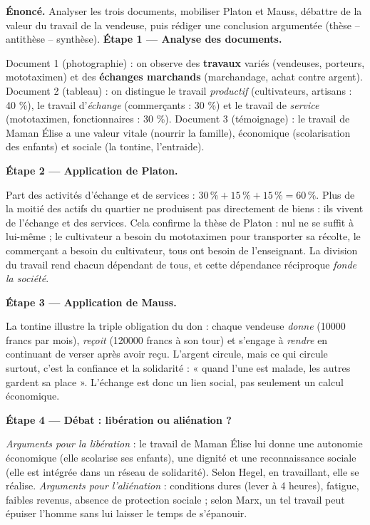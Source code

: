 \documentclass[11pt]{article}
\newcommand{\cle}[1]{{\popxbold\color{popdark}#1}}
\begin{document}
\begin{exoresolu}
\textbf{Énoncé.} Analyser les trois documents, mobiliser Platon et Mauss, débattre de la valeur du travail de la vendeuse, puis rédiger une conclusion argumentée (thèse -- antithèse -- synthèse).
\tcblower
\textbf{Étape 1 --- Analyse des documents.}

Document 1 (photographie) : on observe des \textbf{travaux} variés (vendeuses, porteurs, mototaximen) et des \textbf{échanges marchands} (marchandage, achat contre argent). Document 2 (tableau) : on distingue le travail \emph{productif} (cultivateurs, artisans : 40 \%), le travail d'\emph{échange} (commerçants : 30 \%) et le travail de \emph{service} (mototaximen, fonctionnaires : 30 \%). Document 3 (témoignage) : le travail de Maman Élise a une valeur vitale (nourrir la famille), économique (scolarisation des enfants) et sociale (la tontine, l'entraide).

\textbf{Étape 2 --- Application de Platon.}

Part des activités d'échange et de services : $30\,\% + 15\,\% + 15\,\% = 60\,\%$. Plus de la moitié des actifs du quartier ne produisent pas directement de biens : ils vivent de l'échange et des services. Cela confirme la thèse de Platon : nul ne se suffit à lui-même ; le cultivateur a besoin du mototaximen pour transporter sa récolte, le commerçant a besoin du cultivateur, tous ont besoin de l'enseignant. La \cle{division du travail} rend chacun dépendant de tous, et cette dépendance réciproque \emph{fonde la société}.

\textbf{Étape 3 --- Application de Mauss.}

La tontine illustre la triple obligation du don : chaque vendeuse \emph{donne} (\num{10000} francs par mois), \emph{reçoit} (\num{120000} francs à son tour) et s'engage à \emph{rendre} en continuant de verser après avoir reçu. L'argent circule, mais ce qui circule surtout, c'est la \cle{confiance} et la \cle{solidarité} : « quand l'une est malade, les autres gardent sa place ». L'échange est donc un lien social, pas seulement un calcul économique.

\textbf{Étape 4 --- Débat : libération ou aliénation ?}

\emph{Arguments pour la libération} : le travail de Maman Élise lui donne une autonomie économique (elle scolarise ses enfants), une dignité et une reconnaissance sociale (elle est intégrée dans un réseau de solidarité). Selon Hegel, en travaillant, elle se réalise. \emph{Arguments pour l'aliénation} : conditions dures (lever à 4 heures), fatigue, faibles revenus, absence de protection sociale ; selon Marx, un tel travail peut épuiser l'homme sans lui laisser le temps de s'épanouir.


\end{exoresolu}
\end{document}
